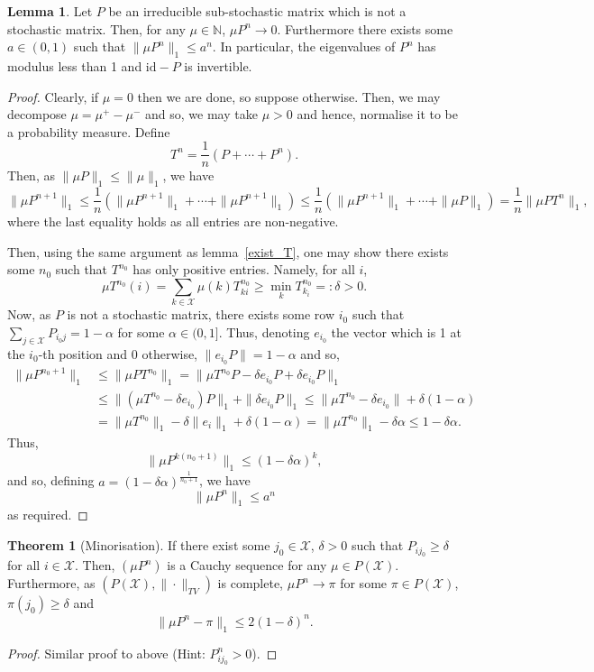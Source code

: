 \documentclass[]{article}
\theoremstyle{definition}
\newtheorem{theorem}{Theorem}
\theoremstyle{definition}
\newtheorem{lemma}{Lemma}[section]
\begin{document}
\begin{lemma}
  Let \(P\) be an irreducible sub-stochastic matrix which is not a stochastic 
  matrix. Then, for any \(\mu \in \mathbb{N}\), \(\mu P^n \to 0\). Furthermore
  there exists some \(a \in (0, 1)\) such that \(\|\mu P^n\|_1 \le a^n\). 
  In particular, the eigenvalues of \(P^n\) has modulus less than 1 and 
  \(\text{id} - P\) is invertible. 
\end{lemma}
\begin{proof}
  Clearly, if \(\mu = 0\) then we are done, so suppose otherwise. Then, 
  we may decompose \(\mu = \mu^+ - \mu^-\) and so, we may take \(\mu > 0\) 
  and hence, normalise it to be a probability measure. 
  Define 
  \[T^n = \frac{1}{n}(P + \cdots + P^n).\]
  Then, as \(\|\mu P\|_1 \le \|\mu\|_1\), we have 
  \[\|\mu P^{n + 1}\|_1 \le \frac{1}{n} (\|\mu P^{n + 1}\|_1 + \cdots + \|\mu P^{n + 1}\|_1) 
  \le \frac{1}{n}(\|\mu P^{n + 1}\|_1 + \cdots + \|\mu P\|_1)
  = \frac{1}{n} \|\mu P T^n\|_1,\]
  where the last equality holds as all entries are non-negative.

  Then, using the same argument as lemma~\ref{exist_T}, one may show there exists some 
  \(n_0\) such that \(T^{n_0}\) has only positive entries. Namely, for all \(i\),
  \[\mu T^{n_0}(i) = \sum_{k \in \mathcal{X}} \mu(k) T^{n_0}_{ki} \ge \min_{k} T_{k_i}^{n_0} =: \delta > 0.\]
  Now, as \(P\) is not a stochastic matrix, there exists some row \(i_0\) such that 
  \(\sum_{j \in \mathcal{X}} P_{i_0 j} = 1 - \alpha\) for some \(\alpha \in (0, 1]\).
  Thus, denoting \(e_{i_0}\) the vector which is 1 at the \(i_0\)-th position and 
  0 otherwise, \(\|e_{i_0} P\| = 1 - \alpha\) and so, 
  \[\begin{split}
    \|\mu P^{n_0 + 1}\|_1 & \le \|\mu P T^{n_0}\|_1 = 
    \|\mu T^{n_0} P - \delta e_{i_0} P + \delta e_{i_0} P\|_1\\
    & \le \|(\mu T^{n_0} - \delta e_{i_0}) P\|_1 + \|\delta e_{i_0} P\|_1
    \le \|\mu T^{n_0} - \delta e_{i_0}\| + \delta(1 - \alpha)\\
    & = \|\mu T^{n_0}\|_1 - \delta\|e_i\|_1 + \delta(1 - \alpha)
    = \|\mu T^{n_0}\|_1 - \delta \alpha \le 1 - \delta \alpha.
  \end{split}\]
  Thus, 
  \[\|\mu P^{k(n_0 + 1)}\|_1 \le (1 - \delta \alpha)^k,\]
  and so, defining \(a = (1 - \delta \alpha)^{\frac{1}{n_0 + 1}}\), we have 
  \[\|\mu P^n\|_1 \le a^n\]
  as required.
\end{proof}

\begin{theorem}[Minorisation]
  If there exist some \(j_0 \in \mathcal{X}\), \(\delta > 0\) such that 
  \(P_{ij_0} \ge \delta\) for all \(i \in \mathcal{X}\). Then, \((\mu P^n)\) 
  is a Cauchy sequence for any \(\mu \in P(\mathcal{X})\). Furthermore, 
  as \((P(\mathcal{X}), \|\cdot\|_{TV})\) is complete, \(\mu P^n \to \pi\) 
  for some \(\pi \in P(\mathcal{X})\), \(\pi(j_0) \ge \delta\) and 
  \[\|\mu P^n - \pi\|_1 \le 2(1 - \delta)^n.\]
\end{theorem}
\begin{proof}
  Similar proof to above (Hint: \(P^n_{ij_0} > 0\)).
\end{proof}
\end{document}
